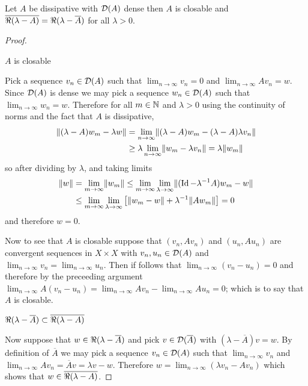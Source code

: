 \begin{prop}\label{DissipativeDenseDomainImpliesClosable}Let $A$ be dissipative with $\mathcal{D}(A)$ dense then $A$ is closable and $\overline{\Re(\lambda -A)} = \Re(\lambda - \overline{A})$ for all $\lambda > 0$.
\end{prop}
\begin{proof}
\begin{clm} $A$ is closable
\end{clm}
Pick a sequence $v_n \in \mathcal{D}(A)$ such that $\lim_{n \to \infty} v_n = 0$ and $\lim_{n \to \infty} A v_n = w$.  Since $\mathcal{D}(A)$ is dense we may pick a sequence $w_n \in \mathcal{D}(A)$ such that $\lim_{n \to \infty} w_n = w$.  Therefore for all $m \in \mathbb{N}$ and $\lambda > 0$ using the continuity of norms and the fact that $A$ is dissipative,
\begin{align*}
\lVert (\lambda - A) w_m - \lambda w \rVert &= \lim_{n \to \infty} \lVert (\lambda - A) w_m - (\lambda - A) \lambda v_n \rVert \\
&\geq \lambda \lim_{n \to \infty} \lVert w_m - \lambda v_n \rVert = \lambda \lVert w_m \rVert
\end{align*}
so after dividing by $\lambda$, and taking limits
\begin{align*}
\lVert w \rVert &= \lim_{m \to \infty} \lVert w_m \rVert \leq \lim_{m \to \infty} \lim_{\lambda \to \infty}\lVert  (\operatorname*{Id} - \lambda^{-1} A) w_m - w \rVert \\
&\leq \lim_{m \to \infty} \lim_{\lambda \to \infty} \left[ \lVert w_m - w \rVert + \lambda^{-1} \lVert A w_m \rVert \right] = 0
\end{align*}
and therefore $w = 0$.  

Now to see that $A$ is closable suppose that $(v_n, A v_n)$ and  $(u_n, A u_n)$ are convergent sequences in $X \times X$ with $v_n, u_n \in \mathcal{D}(A)$ and $\lim_{n \to \infty} v_n = \lim_{n \to \infty} u_n$.  Then if follows that 
$\lim_{n \to \infty} (v_n - u_n) = 0$ and therefore by the preceeding argument $\lim_{n \to \infty} A(v_n - u_n) = \lim_{n \to \infty} Av_n - \lim_{n \to \infty}  A u_n = 0$; which is to say that $A$ is closable.

\begin{clm} $\Re(\lambda - \overline{A}) \subset\overline{\Re(\lambda -A)}$
\end{clm}
Now suppose that $w \in \Re(\lambda - \overline{A})$ and pick $v \in \mathcal{D}(\overline{A})$ with $(\lambda - \overline{A})v = w$.  By definition of $\overline{A}$ we may pick
a sequence $v_n \in \mathcal{D}(A)$ such that $\lim_{n \to \infty} v_n$ and $\lim_{n \to \infty} A v_n = \overline{A} v = \lambda v - w$.  Therefore $w = \lim_{n \to \infty} (\lambda v_n - A v_n)$
which shows that $w \in \overline{\Re(\lambda -A)}$.  


\end{proof}
